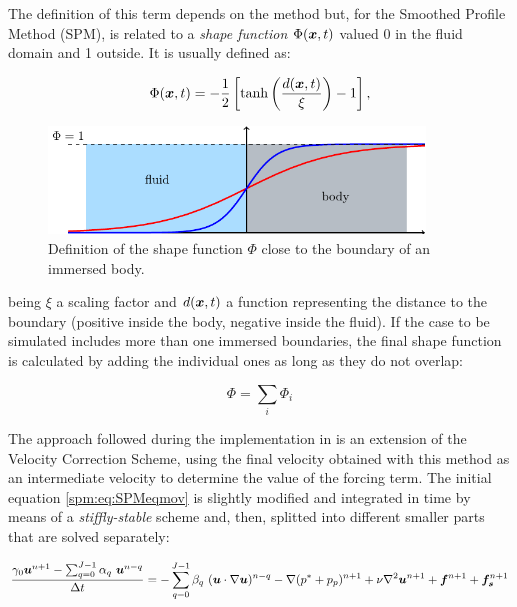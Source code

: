 The definition of this term depends on the method but, for the Smoothed Profile Method (SPM), is related to a \emph{shape function} $\Phi(\boldsymbol{x}, t)$ valued 0 in the fluid domain and 1 outside. It is usually defined as:

\begin{equation} \label{spm:eq:mask}
    \Phi(\boldsymbol{x}, t) = -\frac{1}{2}\left[\tanh\left(\frac{d(\boldsymbol{x}, t)}{\xi}\right)-1\right],
\end{equation}

\begin{figure}[htb]
    \centering
    \includegraphics[width=10cm]{img/concentration.pdf}
    \caption{Definition of the shape function $\Phi$ close to the boundary of an immersed body.}
    \label{spm:fig:shapefunc}
\end{figure}

being $\xi$ a scaling factor \cite{WangSPM} and $d(\boldsymbol{x}, t)$ a function representing the distance to the boundary (positive inside the body, negative inside the fluid). If the case to be simulated includes more than one immersed boundaries, the final shape function is calculated by adding the individual ones as long as they do not overlap:

\begin{equation}
    \Phi = \sum_i \Phi_i
\end{equation}

The approach followed during the implementation in \nek is an extension of the Velocity Correction Scheme, using the final velocity obtained with this method as an intermediate velocity to determine the value of the forcing term. The initial equation \eqref{spm:eq:SPMeqmov} is slightly modified and integrated in time by means of a \emph{stiffly-stable} scheme and, then, splitted into different smaller parts that are solved separately:

\begin{equation}
     \frac{\gamma_0\boldsymbol{u}^{n+1}-\sum_{q=0}^{J-1}\alpha_q~\boldsymbol{u}^{n-q}}{\Delta t} = -\sum_{q=0}^{J-1}\beta_q~(\boldsymbol{u}\cdot\nabla\boldsymbol{u})^{n-q} -\nabla (p^*+p_p)^{n+1} + \nu\nabla^2\boldsymbol{u}^{n+1} + \boldsymbol{f}^{n+1} + \boldsymbol{f_s}^{n+1}
\end{equation}

